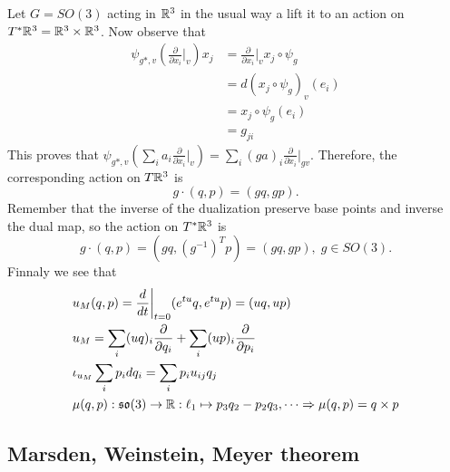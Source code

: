 \begin{example}
    Let $G=SO(3)$ acting in $\mathbb{R}^3$ in the usual way a lift it to an action on $T^*\mathbb{R}^3=\mathbb{R}^3\times\mathbb{R}^3$. 
    Now observe that 
    \begin{equation}
    \begin{split}
    \psi_{g*,v}(\frac{\partial}{\partial x_i}\bigg|_v)x_j&=\frac{\partial}{\partial x_i}\bigg|_vx_j\circ \psi_g \\
    &=d(x_j\circ \psi_g)_v(e_i)\\
    &=x_j \circ\psi_g(e_i)\\
    &=g_{ji}
    \end{split}
    \end{equation}
    This proves that $\psi_{g*,v}(\sum_ia_i\frac{\partial}{\partial x_i}\bigg|_v)
    =\sum_i(ga)_i\frac{\partial}{\partial x_i}\bigg|_{gv}$. Therefore, the corresponding action on $T\mathbb{R}^3$ is 
    \begin{equation}
        g\cdot(q,p)=(gq,gp).
    \end{equation}
    Remember that the inverse of the dualization preserve base points and inverse the dual map, so the action on 
    $T^*\mathbb{R}^3$ is 
    \begin{equation}
        g\cdot (q,p)=(gq,(g^{-1})^Tp)=(gq,gp),\;g\in SO(3).
    \end{equation}
    Finnaly we see that 
    \begin{equation}
        \begin{aligned}
            &u_M(q,p)=\frac{d}{dt}\bigg|_{t=0}(e^{tu}q,e^{tu}p)=(uq,up)\\
            &u_M = \sum_i (uq)_i\frac{\partial}{\partial q_i}+\sum_i (up)_i\frac{\partial}{\partial p_i}\\
            &\iota_{u_M}\sum_ip_idq_i = \sum_i p_iu_{ij}q_j\\
            &\mu(q,p):\mathfrak{so}(3)\to \mathbb{R}: \ell_1\mapsto p_3q_2-p_2q_3,\dots\Rightarrow \mu(q,p)=q\times p
        \end{aligned}
    \end{equation}
\end{example}
\subsection{Marsden, Weinstein, Meyer theorem}

